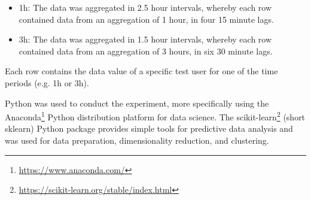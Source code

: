 \begin{itemize}
  \item 1h: The data was aggregated in 2.5 hour intervals, whereby each row contained data from an aggregation of 1 hour, in four 15 minute lags.
  \item 3h: The data was aggregated in 1.5 hour intervals, whereby each row contained data from an aggregation of 3 hours, in six 30 minute lags.
\end{itemize}

Each row contains the data value of a specific test user for one of the time periods (e.g. 1h or 3h).

Python was used to conduct the experiment, more specifically using the Anaconda\footnote{\url{https://www.anaconda.com/}} Python distribution platform for data science. The scikit-learn\footnote{\url{https://scikit-learn.org/stable/index.html}} (short sklearn) Python package provides simple tools for predictive data analysis and was used for data preparation, dimensionality reduction, and clustering.


